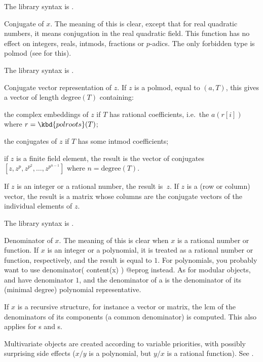 The library syntax is .

\label{se:conj}
Conjugate of $x$. The meaning of this
is clear, except that for real quadratic numbers, it means conjugation in the
real quadratic field. This function has no effect on integers, reals,
intmods, fractions or $p$-adics. The only forbidden type is polmod
(see  for this).

The library syntax is .

\label{se:conjvec}
Conjugate vector representation of $z$. If $z$ is a
polmod, equal to $(a,T)$, this gives a vector of length
$\text{degree}(T)$ containing:

\item the complex embeddings of $z$ if $T$ has rational coefficients,
i.e.~the $a(r[i])$ where $r = \kbd{polroots}(T)$;

\item the conjugates of $z$ if $T$ has some intmod coefficients;

\noindent if $z$ is a finite field element, the result is the vector of
conjugates $[z,z^p,z^{p^2},\ldots,z^{p^{n-1}}]$ where $n=\text{degree}(T)$.

\noindent If $z$ is an integer or a rational number, the result is~$z$. If
$z$ is a (row or column) vector, the result is a matrix whose columns are
the conjugate vectors of the individual elements of $z$.

The library syntax is .

\label{se:denominator}
Denominator of $x$. The meaning of this
is clear when $x$ is a rational number or function. If $x$ is an integer
or a polynomial, it is treated as a rational number or function,
respectively, and the result is equal to $1$. For polynomials, you
probably want to use
\bprog
denominator( content(x) )
@eprog\noindent
instead. As for modular objects,  and  have
denominator $1$, and the denominator of a  is the denominator
of its (minimal degree) polynomial representative.

If $x$ is a recursive structure, for instance a vector or matrix, the lcm
of the denominators of its components (a common denominator) is computed.
This also applies for s and s.

 Multivariate objects are created according to variable
priorities, with possibly surprising side effects ($x/y$ is a polynomial, but
$y/x$ is a rational function). See .

